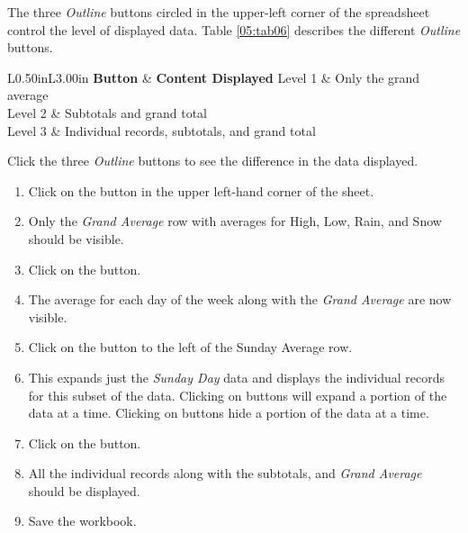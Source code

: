 The three \textit{Outline} buttons circled in the upper-left corner of the spreadsheet control the level of displayed data. Table \ref{05:tab06} describes the different \textit{Outline} buttons.

\begin{table}[H]
	{\small
		\begin{longtable}{L{0.50in}L{3.00in}} %
			\textbf{Button} & \textbf{Content Displayed} \endhead
			\hline
			Level 1 & Only the grand average\\
			Level 2 & Subtotals and grand total\\
			Level 3 & Individual records, subtotals, and grand total\\
			\caption{Subtotal Outline Buttons}
			\label{05:tab06}
		\end{longtable}
	} %
\end{table}

Click the three \textit{Outline} buttons to see the difference in the data displayed.

\begin{enumbox}
	\begin{enumerate}
		\item Click on the  button in the upper left-hand corner of the sheet.
		\item Only the \textit{Grand Average} row with averages for High, Low, Rain, and Snow should be visible.
		\item Click on the  button.
		\item The average for each day of the week along with the \textit{Grand Average} are now visible.
		\item Click on the  button to the left of the Sunday Average row.
		\item This expands just the \textit{Sunday Day} data and displays the individual records for this subset of the data. Clicking on  buttons will expand a portion of the data at a time. Clicking on  buttons hide a portion of the data at a time.
		\item Click on the  button.
		\item All the individual records along with the subtotals, and \textit{Grand Average} should be displayed. 
		\item Save the  workbook.
	\end{enumerate}
\end{enumbox}
	
